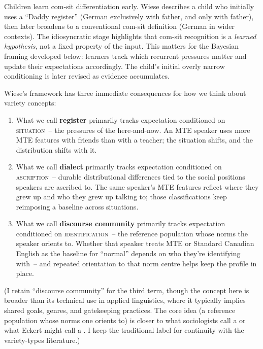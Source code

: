 \documentclass[11pt,letterpaper]{article}
\begin{document}
Children learn com-sit differentiation early. Wiese describes a child who initially uses a \enquote{Daddy register} (German exclusively with father, and only with father), then later broadens to a conventional com-sit definition (German in wider contexts). The idiosyncratic stage highlights that com-sit recognition is a \emph{learned hypothesis}, not a fixed property of the input. This matters for the Bayesian framing developed below: learners track which recurrent pressures matter and update their expectations accordingly. The child's initial overly narrow conditioning is later revised as evidence accumulates.

Wiese's framework has three immediate consequences for how we think about variety concepts:

\begin{enumerate}
    \item What we call \textbf{register} primarily tracks expectation conditioned on \textsc{situation}~-- the pressures of the here-and-now. An MTE speaker uses more MTE features with friends than with a teacher; the situation shifts, and the distribution shifts with it.
    \item What we call \textbf{dialect} primarily tracks expectation conditioned on \textsc{ascription}~-- durable distributional differences tied to the social positions speakers are ascribed to. The same speaker's MTE features reflect where they grew up and who they grew up talking to; those classifications keep reimposing a baseline across situations.
    \item What we call \textbf{discourse community} primarily tracks expectation conditioned on \textsc{identification}~-- the reference population whose norms the speaker orients to. Whether that speaker treats MTE or Standard Canadian English as the baseline for \enquote{normal} depends on who they're identifying with~-- and repeated orientation to that norm centre helps keep the profile in place.
\end{enumerate}

(I retain \enquote{discourse community} for the third term, though the concept here is broader than its technical use in applied linguistics, where it typically implies shared goals, genres, and gatekeeping practices. The core idea (a reference population whose norms one orients to) is closer to what sociologists call a  or what Eckert might call a . I keep the traditional label for continuity with the variety-types literature.)
\end{document}
